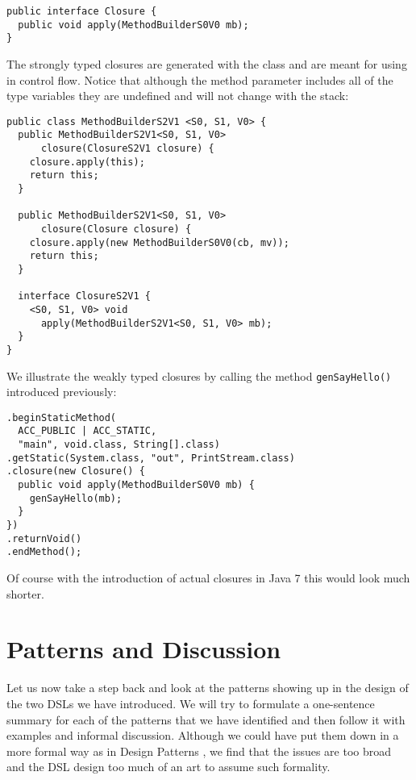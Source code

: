 \documentclass{sig-alternate}
\begin{document}
\begin{verbatim}
public interface Closure {
  public void apply(MethodBuilderS0V0 mb);
}
\end{verbatim}

The strongly typed closures are generated with the class and are meant for using in control flow. Notice that although the method parameter includes all of the type variables they are undefined and will not change with the stack:

\begin{verbatim}
public class MethodBuilderS2V1 <S0, S1, V0> {
  public MethodBuilderS2V1<S0, S1, V0> 
      closure(ClosureS2V1 closure) {
    closure.apply(this);
    return this;
  }

  public MethodBuilderS2V1<S0, S1, V0> 
      closure(Closure closure) {
    closure.apply(new MethodBuilderS0V0(cb, mv));
    return this;
  }

  interface ClosureS2V1 {
    <S0, S1, V0> void 
      apply(MethodBuilderS2V1<S0, S1, V0> mb);
  }
}
\end{verbatim}

We illustrate  the weakly typed closures by calling the method \verb!genSayHello()! introduced previously:

\begin{verbatim}
.beginStaticMethod(
  ACC_PUBLIC | ACC_STATIC, 
  "main", void.class, String[].class)
.getStatic(System.class, "out", PrintStream.class)
.closure(new Closure() {
  public void apply(MethodBuilderS0V0 mb) {
    genSayHello(mb);
  }
})
.returnVoid()
.endMethod();
\end{verbatim}

Of course with the introduction of actual closures in Java 7 this would look much shorter.

\section{Patterns and Discussion}

Let us now take a step back and look at the patterns showing up in the design of the two DSLs we have introduced. We will try to formulate a one-sentence summary for each of the patterns that we have identified and then follow it with examples and informal discussion. Although we could have put them down in a more formal way as in Design Patterns \cite{gamma1995dpe}, we find that the issues are too broad and the DSL design too much of an art to assume such formality.
\end{document}
